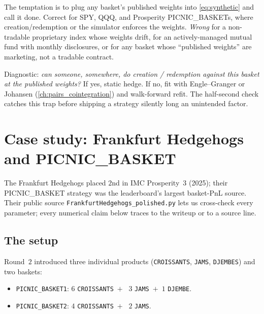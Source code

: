 \begin{pitfallbox}
The temptation is to plug any basket's published weights into
\eqref{eq:synthetic} and call it done. Correct for SPY, QQQ, and
Prosperity PICNIC\_BASKETs, where creation/redemption or the
simulator enforces the weights. \emph{Wrong} for a non-tradable
proprietary index whose weights drift, for an actively-managed
mutual fund with monthly disclosures, or for any basket whose
``published weights'' are marketing, not a tradable contract.

Diagnostic: \emph{can someone, somewhere, do creation / redemption
against this basket at the published weights?} If yes, static
hedge. If no, fit with Engle--Granger or Johansen
(\cref{ch:pairs_cointegration}) and walk-forward refit. The
half-second check catches this trap before shipping a strategy
silently long an unintended factor.
\end{pitfallbox}

\section{Case study: Frankfurt Hedgehogs and PICNIC\_BASKET}
\label{sec:ch11_hedgehogs}

The Frankfurt Hedgehogs placed $2$nd in IMC Prosperity~$3$ (2025);
their PICNIC\_BASKET strategy
\citep[\texttt{imc-prosperity-3/README.md}, \S\,Round 2]{frankfurthedgehogs2025}
was the leaderboard's largest basket-PnL source. Their public
source \texttt{FrankfurtHedgehogs\_polished.py} lets us cross-check
every parameter; every numerical claim below traces to the writeup
or to a source line.

\subsection{The setup}
\label{sec:ch11_hh_setup}

Round~$2$ introduced three individual products
(\texttt{CROISSANTS}, \texttt{JAMS}, \texttt{DJEMBES}) and two
baskets:

\begin{itemize}
  \item \texttt{PICNIC\_BASKET1}: $6$ \texttt{CROISSANTS}~$+$~%
        $3$ \texttt{JAMS}~$+$~$1$ \texttt{DJEMBE}.
  \item \texttt{PICNIC\_BASKET2}: $4$ \texttt{CROISSANTS}~$+$~%
        $2$ \texttt{JAMS}.
\end{itemize}

